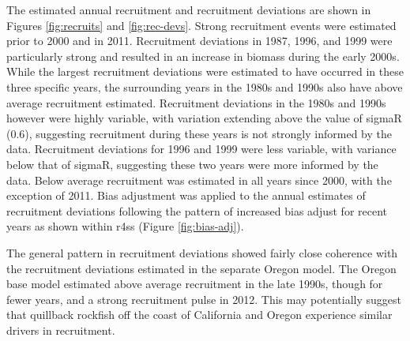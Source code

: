 \documentclass[11pt,
  english,
  a4paper,
]{article}
\begin{document}
\leavevmode\tagmcend\tagstructend\par


The estimated annual recruitment and recruitment deviations are shown in Figures \ref{fig:recruits} and \ref{fig:rec-devs}. Strong recruitment events were estimated prior to 2000 and in 2011. Recruitment deviations in 1987, 1996, and 1999 were particularly strong and resulted in an increase in biomass during the early 2000s. While the largest recruitment deviations were estimated to have occurred in these three specific years, the surrounding years in the 1980s and 1990s also have above average recruitment estimated. Recruitment deviations in the 1980s and 1990s however were highly variable, with variation extending above the value of sigmaR (0.6), suggesting recruitment during these years is not strongly informed by the data. Recruitment deviations for 1996 and 1999 were less variable, with variance below that of sigmaR, suggesting these two years were more informed by the data. Below average recruitment was estimated in all years since 2000, with the exception of 2011. Bias adjustment was applied to the annual estimates of recruitment deviations following the pattern of increased bias adjust for recent years as shown within r4ss (Figure \ref{fig:bias-adj}).

\leavevmode\tagmcend\tagstructend\par


The general pattern in recruitment deviations showed fairly close coherence with the recruitment deviations estimated in the separate Oregon model. The Oregon base model estimated above average recruitment in the late 1990s, though for fewer years, and a strong recruitment pulse in 2012. This may potentially suggest that quillback rockfish off the coast of California and Oregon experience similar drivers in recruitment.

\leavevmode\tagmcend\tagstructend\par

\end{document}

